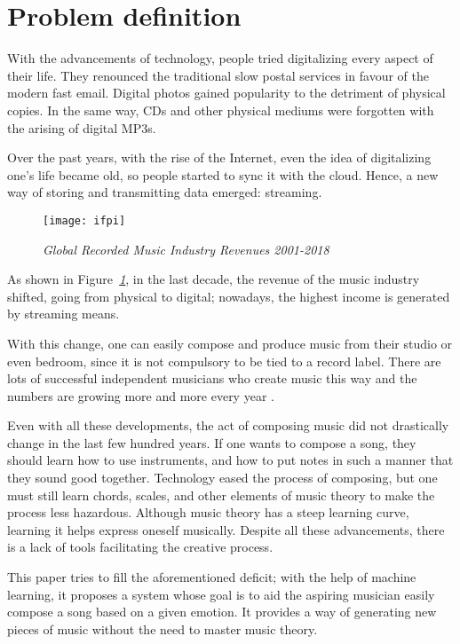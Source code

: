 \section{Problem definition}
With the advancements of technology,
people tried digitalizing every aspect of their life.
They renounced the traditional slow postal services in favour of
the modern fast email.
Digital photos gained popularity to the detriment of physical copies.
In the same way, CDs and other physical mediums were
forgotten with the arising of digital MP3s.


Over the past years, with the rise of the Internet,
even the idea of digitalizing one's life became old,
so people started to sync it with the cloud.
Hence, a new way of storing and transmitting data emerged: streaming.

\begin{figure}[h]
      \centering
      \texttt{[image: ifpi]}
      \caption{\emph{Global Recorded Music Industry Revenues 2001-2018  \cite{ifpi}}}
      \label{fig:ifpi}
\end{figure}

As shown in Figure\emph{~\ref{fig:ifpi}}, in the last decade,
the revenue of the music industry shifted,
going from physical to digital; nowadays,
the highest income is generated by streaming means.

With this change, one can easily compose and produce
music from their studio or even bedroom,
since it is not compulsory to be tied to a record label.
There are lots of successful independent musicians who
create music this way and the numbers are growing more
and more every year \cite{forbes}.

Even with all these developments,
the act of composing music did not drastically change in the last
few hundred years. If one wants to compose a song,
they should learn how to use instruments,
and how to put notes in such a manner that they sound good together.
Technology eased the process of composing,
but one must still learn chords, scales,
and other elements of music theory to make the process less hazardous.
Although music theory has a steep learning curve,
learning it helps express oneself musically.
Despite all these advancements,
there is a lack of tools facilitating the creative process.

This paper tries to fill the aforementioned deficit;
with the help of machine learning,
it proposes a system whose goal is to aid the aspiring musician easily
compose a song based on a given emotion.
It provides a way of generating new pieces of music without the need to master music theory.


